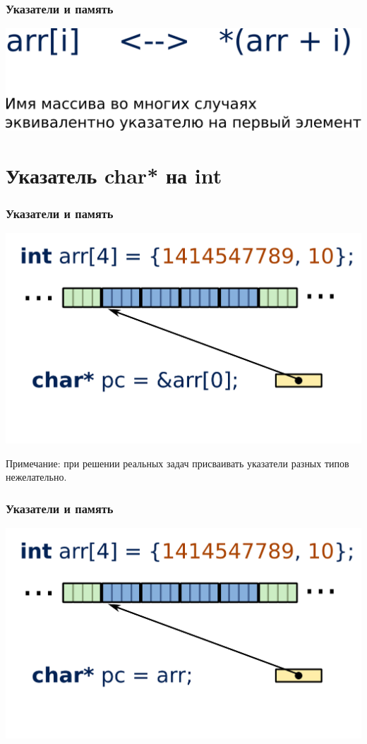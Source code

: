 \documentclass[12pt,pdf,hyperref={unicode}]{beamer}
\begin{document}
\begin{frame}[fragile]
\frametitle{Указатели и память} 
\begin{center}
\includegraphics[width=0.95\linewidth]{images/arr_pointer_equality.png}
\end{center}
\end{frame}


\section{Указатель char* на int}

\begin{frame}[fragile]
\frametitle{Указатели и память} 
\begin{center}
\includegraphics[width=0.95\linewidth]{images/memory_different_pointers_4a.png}
\end{center}
Примечание: при решении реальных задач присваивать указатели разных типов нежелательно.
\end{frame}

\begin{frame}[fragile]
\frametitle{Указатели и память} 
\begin{center}
\includegraphics[width=0.95\linewidth]{images/memory_different_pointers_4b.png}
\end{center}
\end{frame}
\end{document}
